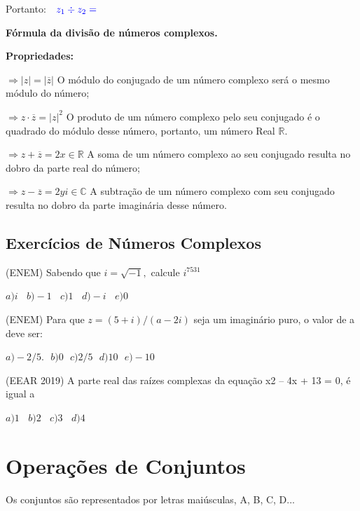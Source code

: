 \begin{multicols*}{2}
	Portanto: $\color{blue} \ \ z_1 \div z_2= $\\


	\textbf{Fórmula da divisão de números complexos.}

	\textbf{Propriedades:}

	$\Rightarrow |z| = |\overline{z}| $ O módulo do conjugado de um número complexo será o mesmo módulo do número;

	$\Rightarrow z \cdot \overline{z} = |z|^2 $ O produto de um número complexo pelo seu conjugado é o quadrado do módulo desse número, portanto, um número Real $\mathbb{R}.$

	$\Rightarrow z + \overline{z} = 2 x \in \mathbb{R} $ A soma de um número complexo ao seu conjugado resulta no dobro da parte real do número;

	$\Rightarrow z - \overline{z} = 2yi \in \mathbb{C} $ A subtração de um número complexo com seu conjugado resulta no dobro da parte imaginária desse número.

	\subsection{Exercícios de Números Complexos}

	
	\setcounter{numexercicio}{0}
	\execnum (ENEM) Sabendo que  $ i = \sqrt{-1}, $ calcule $ i^{7531}$

	$a)  i \ \ \ \ b) -1 \ \ \ \  c) 1 \ \ \ \  d) -i \ \ \ \  e) 0$

	\execnum (ENEM) Para que $z = (5 + i)/(a - 2i)$ seja um imaginário puro, o valor de a deve ser:

	$a) -2/5. \ \ \  b) 0 \ \ \ c) 2/5 \ \ \  d) 10  \ \ \  e) -10 $

	\execnum (EEAR 2019) A parte real das raízes complexas da equação x2 – 4x + 13 = 0, é igual a

	$ a) 1 \ \ \ \  b) 2 \ \ \ \  c) 3 \ \ \ \  d) 4 $



	\section{Operações de Conjuntos}

	Os conjuntos são representados por letras maiúsculas, A, B, C, D...


\end{multicols*}

